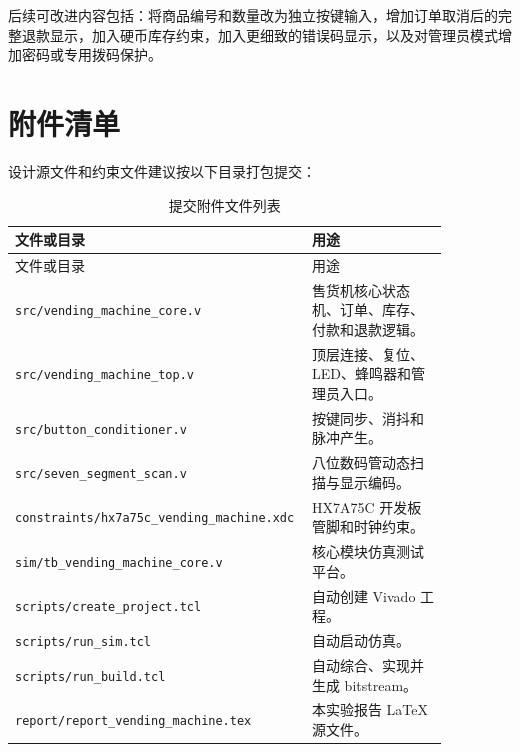 \documentclass[UTF8,a4paper,12pt]{ctexart}
\begin{document}
后续可改进内容包括：将商品编号和数量改为独立按键输入，增加订单取消后的完整退款显示，加入硬币库存约束，加入更细致的错误码显示，以及对管理员模式增加密码或专用拨码保护。

\section{附件清单}

设计源文件和约束文件建议按以下目录打包提交：

\begin{longtable}{p{0.55\linewidth}p{0.31\linewidth}}
\caption{提交附件文件列表}\label{tab:files}\\
\toprule
文件或目录 & 用途 \\
\midrule
\endfirsthead
\toprule
文件或目录 & 用途 \\
\midrule
\endhead
\bottomrule
\endfoot
\texttt{src/vending\_machine\_core.v} & 售货机核心状态机、订单、库存、付款和退款逻辑。 \\
\texttt{src/vending\_machine\_top.v} & 顶层连接、复位、LED、蜂鸣器和管理员入口。 \\
\texttt{src/button\_conditioner.v} & 按键同步、消抖和脉冲产生。 \\
\texttt{src/seven\_segment\_scan.v} & 八位数码管动态扫描与显示编码。 \\
\texttt{constraints/hx7a75c\_vending\_machine.xdc} & HX7A75C 开发板管脚和时钟约束。 \\
\texttt{sim/tb\_vending\_machine\_core.v} & 核心模块仿真测试平台。 \\
\texttt{scripts/create\_project.tcl} & 自动创建 Vivado 工程。 \\
\texttt{scripts/run\_sim.tcl} & 自动启动仿真。 \\
\texttt{scripts/run\_build.tcl} & 自动综合、实现并生成 bitstream。 \\
\texttt{report/report\_vending\_machine.tex} & 本实验报告 LaTeX 源文件。 \\
\bottomrule
\end{longtable}
\end{document}
